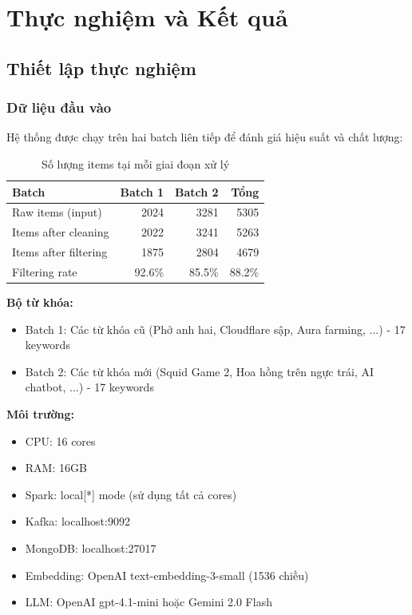 
\chapter{Thực nghiệm và Kết quả}

\section{Thiết lập thực nghiệm}

\subsection{Dữ liệu đầu vào}

Hệ thống được chạy trên hai batch liên tiếp để đánh giá hiệu suất và chất lượng:

\begin{table}[H]
    \centering
    \begin{tabular}{|l|r|r|r|}
    \hline
    \textbf{Batch} & \textbf{Batch 1} & \textbf{Batch 2} & \textbf{Tổng} \\
    \hline
    Raw items (input) & 2024 & 3281 & 5305 \\
    Items after cleaning & 2022 & 3241 & 5263 \\
    Items after filtering & 1875 & 2804 & 4679 \\
    Filtering rate & 92.6\% & 85.5\% & 88.2\% \\
    \hline
    \end{tabular}
    \caption{Số lượng items tại mỗi giai đoạn xử lý}
    \label{table:input_stats}
\end{table}

\textbf{Bộ từ khóa:}
\begin{itemize}
    \item Batch 1: Các từ khóa cũ (Phở anh hai, Cloudflare sập, Aura farming, ...) - 17 keywords
    \item Batch 2: Các từ khóa mới (Squid Game 2, Hoa hồng trên ngực trái, AI chatbot, ...) - 17 keywords
\end{itemize}

\textbf{Môi trường:}
\begin{itemize}
    \item CPU: 16 cores
    \item RAM: 16GB
    \item Spark: local[*] mode (sử dụng tất cả cores)
    \item Kafka: localhost:9092
    \item MongoDB: localhost:27017
    \item Embedding: OpenAI text-embedding-3-small (1536 chiều)
    \item LLM: OpenAI gpt-4.1-mini hoặc Gemini 2.0 Flash
\end{itemize}

